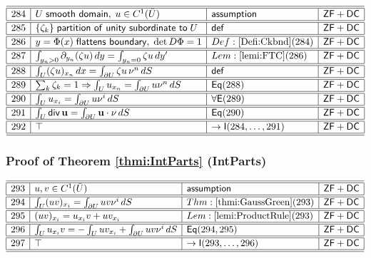 \documentclass[11pt,reqno]{amsart}
\begin{document}
\noindent$%
\begin{array}{|r|l|l|l|}
\hline\hline
284 & U\;\mathsf{smooth\ domain},\;u\in C^{1}(\bar{U}) & \mathsf{assumption} & \mathsf{ZF+DC} \\ \hline\hline
285 & \{\zeta_{k}\}\;\mathsf{partition\ of\ unity\ subordinate\ to}\;U & \mathsf{def} & \mathsf{ZF+DC} \\ \hline\hline
286 & y=\Phi(x)\;\mathsf{flattens\ boundary},\;\det D\Phi=1 & Def:\ref{Defi:Ckbnd}(284) & \mathsf{ZF+DC} \\ \hline\hline
287 & \int_{y_{n}>0}\partial_{y_{n}}(\zeta u)\,dy=\int_{y_{n}=0}\zeta u\,dy^{\prime} & Lem:\ref{lemi:FTC}(286) & \mathsf{ZF+DC} \\ \hline\hline
288 & \int_{U}(\zeta u)_{x_{n}}\,dx=\int_{\partial U}\zeta u\,\nu^{n}\,dS & \mathsf{def} & \mathsf{ZF+DC} \\ \hline\hline
289 & \sum_{k}\zeta_{k}=1\Rightarrow\int_{U}u_{x_{n}}=\int_{\partial U}u\nu^{n}\,dS & \mathsf{Eq}(288) & \mathsf{ZF+DC} \\ \hline\hline
290 & \int_{U}u_{x_{i}}=\int_{\partial U}u\nu^{i}\,dS & \forall\mathsf{E}(289) & \mathsf{ZF+DC} \\ \hline\hline
291 & \int_{U}\mathsf{div}\,\mathbf{u}=\int_{\partial U}\mathbf{u}\cdot\nu\,dS & \mathsf{Eq}(290) & \mathsf{ZF+DC} \\ \hline\hline
292 & \top & \to\mathsf{I}(284,\dots,291) & \mathsf{ZF+DC} \\ \hline\hline
\end{array}%
$

\medskip

\subsubsection*{Proof of Theorem \ref{thmi:IntParts} (\textsf{IntParts})}

\noindent$%
\begin{array}{|r|l|l|l|}
\hline\hline
293 & u,v\in C^{1}(\bar{U}) & \mathsf{assumption} & \mathsf{ZF+DC} \\ \hline\hline
294 & \int_{U}(uv)_{x_{i}}=\int_{\partial U}uv\nu^{i}\,dS & Thm:\ref{thmi:GaussGreen}(293) & \mathsf{ZF+DC} \\ \hline\hline
295 & (uv)_{x_{i}}=u_{x_{i}}v+uv_{x_{i}} & Lem:\ref{lemi:ProductRule}(293) & \mathsf{ZF+DC} \\ \hline\hline
296 & \int_{U}u_{x_{i}}v=-\int_{U}uv_{x_{i}}+\int_{\partial U}uv\nu^{i}\,dS & \mathsf{Eq}(294,295) & \mathsf{ZF+DC} \\ \hline\hline
297 & \top & \to\mathsf{I}(293,\dots,296) & \mathsf{ZF+DC} \\ \hline\hline
\end{array}%
$
\end{document}
